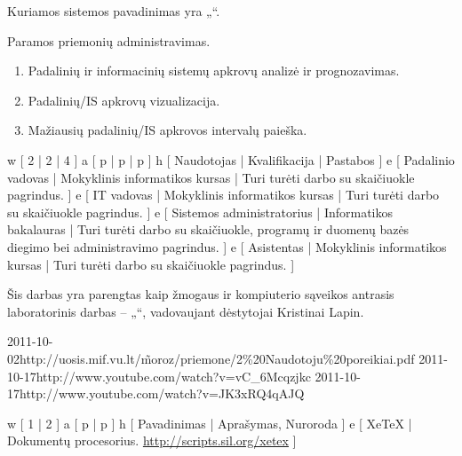 Kuriamos sistemos pavadinimas yra „\systemname“.

Paramos priemonių administravimas.

\begin{enumerate}
  \item Padalinių ir informacinių sistemų apkrovų analizė ir prognozavimas.
  \item Padalinių/IS apkrovų vizualizacija.
  \item Mažiausių padalinių/IS apkrovos intervalų paieška.
\end{enumerate}

\xtable
{
  w [ 2 | 2 | 4 ]
  a [ p | p | p ]
  h [ Naudotojas | Kvalifikacija | Pastabos ]
  e [ Padalinio vadovas | Mokyklinis informatikos kursas
  | Turi turėti darbo su skaičiuokle pagrindus.
  ]
  e [ IT vadovas | Mokyklinis informatikos kursas
  | Turi turėti darbo su skaičiuokle pagrindus.
  ]
  e [ Sistemos administratorius | Informatikos bakalauras
  | Turi turėti darbo su skaičiuokle, programų ir duomenų bazės diegimo
  bei administravimo pagrindus.
  ]
  e [ Asistentas | Mokyklinis informatikos kursas
  | Turi turėti darbo su skaičiuokle pagrindus.
  ]
}

Šis darbas yra parengtas kaip žmogaus ir kompiuterio sąveikos
antrasis laboratorinis darbas – „\docname“, vadovaujant
dėstytojai Kristinai Lapin.

\xdoclist
{
  {2011-10-02}{http://uosis.mif.vu.lt/\~moroz/priemone/2\%20Naudotoju\%20poreikiai.pdf}
  {2011-10-17}{http://www.youtube.com/watch?v=vC_6Mcqzjkc}
  {2011-10-17}{http://www.youtube.com/watch?v=JK3xRQ4qAJQ}
}

\xtableu
{
  w [ 1 | 2 ]
  a [ p | p ]
  h [ Pavadinimas | Aprašymas, Nuroroda ]
  e [ XeTeX | Dokumentų procesorius. \newline \url{http://scripts.sil.org/xetex} ]
}
